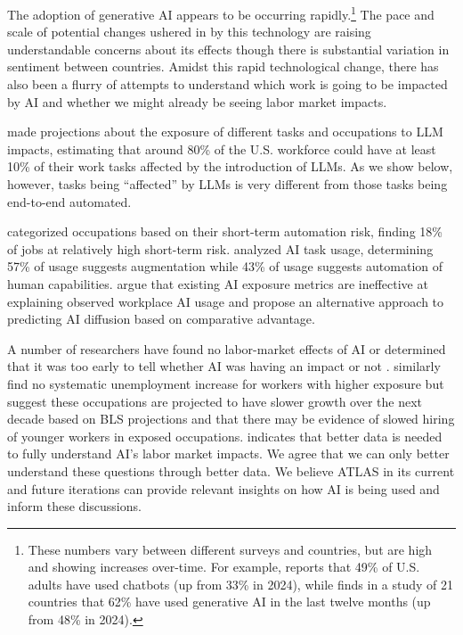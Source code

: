 \documentclass[11pt,a4paper]{article}
\begin{document}
The adoption of generative AI appears to be occurring rapidly.\footnote{These numbers vary between different surveys and countries, but are high and showing increases over-time. For example, \cite{pew_2026_americans_ai} reports that 49\% of U.S. adults have used chatbots (up from 33\% in 2024), while \cite{ipsos_google_2026_ai_survey} finds in a study of 21 countries that 62\% have used generative AI in the last twelve months (up from 48\% in 2024).} The pace and scale of potential changes ushered in by this technology are raising understandable concerns about its effects \citep{ipsos_google_2026_ai_survey} though there is substantial variation in sentiment between countries. Amidst this rapid technological change, there has also been a flurry of attempts to understand which work is going to be impacted by AI and whether we might already be seeing labor market impacts.

\citet{Eloundou2024} made projections about the exposure of different tasks and occupations to LLM impacts, estimating that around 80\% of the U.S. workforce could have at least 10\% of their work tasks affected by the introduction of LLMs. As we show below, however, tasks being ``affected'' by LLMs is very different from those tasks being end-to-end automated.

\citet{richmond2026ai} categorized occupations based on their short-term automation risk, finding 18\% of jobs at relatively high short-term risk. \citet{handa2025economictasksperformedai} analyzed AI task usage, determining 57\% of usage suggests augmentation while 43\% of usage suggests automation of human capabilities. \citet{NBERw35271} argue that existing AI exposure metrics are ineffective at explaining observed workplace AI usage and propose an alternative approach to predicting AI diffusion based on comparative advantage.

A number of researchers have found no labor-market effects of AI or determined that it was too early to tell whether AI was having an impact or not \citep[e.g.,][]{AudolyGuerinTopa2026, gimbel2026what, NBERw33777, iscenko2026looking}. \citet{massenkoffmccrory2026labor} similarly find no systematic unemployment increase for workers with higher exposure but suggest these occupations are projected to have slower growth over the next decade based on BLS projections and that there may be evidence of slowed hiring of younger workers in exposed occupations. \citet{kolko2026ai} indicates that better data is needed to fully understand AI's labor market impacts. We agree that we can only better understand these questions through better data. We believe ATLAS in its current and future iterations can provide relevant insights on how AI is being used and inform these discussions.
\end{document}
